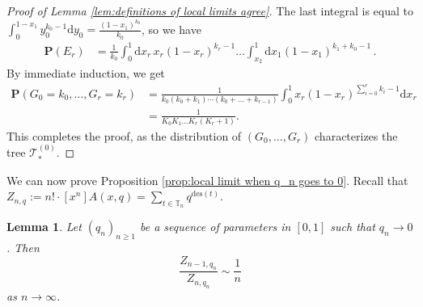 \documentclass{article}
\newtheorem{lemma}[theorem]{Lemma}
\theoremstyle{remark}
\newcommand{\bT}{\mathbb{T}}
\newcommand{\cT}{\mathcal{T}}
\newcommand{\prob}[1]{\mathbf{P}{\left(#1\right)}}
\newcommand{\des}[1]{{\mathrm{des}{\left(#1\right)}}}
\begin{document}
\begin{proof}[Proof of Lemma \ref{lem:definitions of local limits agree}]
The last integral is equal to $\int_0^{1-x_1} y_0^{k_0-1} \mathrm dy_0 = \frac{(1-x_1)^{k_0}}{k_0}$,
so we have
\begin{align*}
\prob{E_r}
&=
\frac{1}{k_0} \int_0^1 \mathrm dx_r\, x_r(1-x_r)^{k_r-1} 
\ldots 
\int_{x_2}^1 \mathrm dx_1 (1-x_1)^{k_1+k_0-1} \,.
\end{align*}
By immediate induction, we get
\begin{align*}
\prob{G_0=k_0,\ldots,G_r=k_r}
&= \frac{1}{k_0(k_0+k_1) \cdots (k_0+\ldots+k_{r-1})} \int_0^1 x_r(1-x_r)^{\sum_{i=0}^r k_i-1} \mathrm dx_r \\
&= \frac{1}{K_0 K_1 \ldots K_r (K_r+1)}.
\end{align*}
This completes the proof, as the distribution of $(G_0,\ldots,G_r)$ characterizes the tree $\cT_*^{(0)}$.
\end{proof}

We can now prove Proposition \ref{prop:local limit when q_n goes to 0}. Recall that $Z_{n,q} := n! \cdot [x^n] A(x,q) = \sum_{t\in \bT_n} q^\des{t}$.

\begin{lemma}\label{lem: ratio of partition functions when q to 0}
    Let $(q_n)_{n\ge1}$ be a sequence of parameters in $[0,1]$ such that $q_n\to0$.
    Then
    \[
    \frac{Z_{n-1,q_n}}{Z_{n,q_n}} \sim \frac1n 
    \]
    as $n\to\infty$.
\end{lemma}
\end{document}

